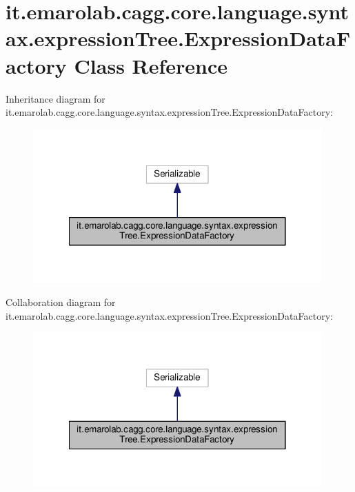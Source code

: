 \hypertarget{classit_1_1emarolab_1_1cagg_1_1core_1_1language_1_1syntax_1_1expressionTree_1_1ExpressionDataFactory}{\section{it.\-emarolab.\-cagg.\-core.\-language.\-syntax.\-expression\-Tree.\-Expression\-Data\-Factory Class Reference}
\label{classit_1_1emarolab_1_1cagg_1_1core_1_1language_1_1syntax_1_1expressionTree_1_1ExpressionDataFactory}
}


Inheritance diagram for it.\-emarolab.\-cagg.\-core.\-language.\-syntax.\-expression\-Tree.\-Expression\-Data\-Factory\-:\nopagebreak
\begin{figure}[H]
\begin{center}
\leavevmode
\includegraphics[width=314pt]{classit_1_1emarolab_1_1cagg_1_1core_1_1language_1_1syntax_1_1expressionTree_1_1ExpressionDataFactory__inherit__graph}
\end{center}
\end{figure}


Collaboration diagram for it.\-emarolab.\-cagg.\-core.\-language.\-syntax.\-expression\-Tree.\-Expression\-Data\-Factory\-:\nopagebreak
\begin{figure}[H]
\begin{center}
\leavevmode
\includegraphics[width=314pt]{classit_1_1emarolab_1_1cagg_1_1core_1_1language_1_1syntax_1_1expressionTree_1_1ExpressionDataFactory__coll__graph}
\end{center}
\end{figure}
